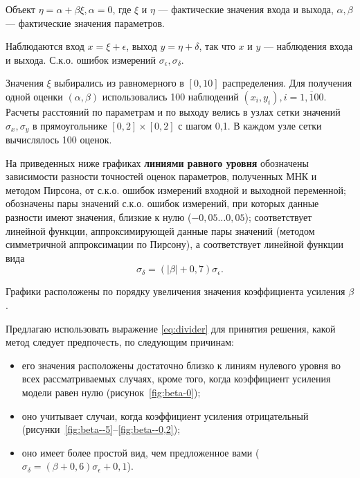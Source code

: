 \documentclass[a4paper,landscape,hidelinks,14pt]{extarticle}
\begin{document}

Объект \( \eta = \alpha + \beta \xi, \alpha = 0 \),
где \( \xi \) и \( \eta \) --- фактические значения входа и выхода,
\( \alpha, \beta \) --- фактические значения параметров.

Наблюдаются вход \( x = \xi + \epsilon \), выход \( y = \eta + \delta \),
так что \( x \) и \( y \) --- наблюдения входа и выхода.
С.к.о. ошибок измерений \( \sigma_{\epsilon}, \sigma_{\delta} \).

Значения \( \xi \) выбирались из равномерного в \( [0, 10] \) распределения.
Для получения одной оценки \( ( \alpha, \beta ) \) использовались 100 наблюдений
\( ( x_i, y_i ), i = \overline{1, 100} \). Расчеты расстояний по параметрам и по выходу
велись в узлах сетки значений \( \sigma_x, \sigma_y \) в прямоугольнике
\( [0, 2] \times [0, 2] \) с шагом 0{,}1. В каждом узле сетки вычислялось 100 оценок.

На приведенных ниже графиках
\textbf{линиями равного уровня} обозначены зависимости
разности точностей оценок параметров, полученных МНК и методом Пирсона, от
с.к.о. ошибок измерений входной и выходной переменной;
\textbf{\color{red}{красными точками}} обозначены пары значений с.к.о. ошибок измерений,
при которых данные разности имеют значения, близкие к нулю (\( -0{,}05 \ldots 0{,}05 \));
\textbf{\color{red}{прямая красного цвета}} соответствует линейной функции,
аппроксимирующей данные пары значений (методом симметричной аппроксимации по Пирсону),
а \textbf{\color{blue}{прямая синего цвета}} соответствует линейной функции вида
\begin{equation}
  \label{eq:divider}
  \sigma_{\delta} = (|\beta| + 0{,}7) \sigma_{\epsilon}.
\end{equation}

Графики расположены по порядку увеличения значения коэффициента усиления \( \beta \).

Предлагаю использовать выражение \eqref{eq:divider} для принятия решения,
какой метод следует предпочесть, по следующим причинам:
\begin{itemize}
\item его значения расположены достаточно близко к линиям нулевого уровня во всех
  рассматриваемых случаях, кроме того, когда коэффициент усиления модели равен нулю
  (рисунок~\ref{fig:beta-0});
\item оно учитывает случаи, когда коэффициент усиления отрицательный
  (рисунки~\ref{fig:beta--5}--\ref{fig:beta--0,2});
\item оно имеет более простой вид, чем предложенное вами
  (\( \sigma_{\delta} = (\beta + 0{,}6) \sigma_{\epsilon} + 0{,}1 \)).
\end{itemize}
\end{document}
